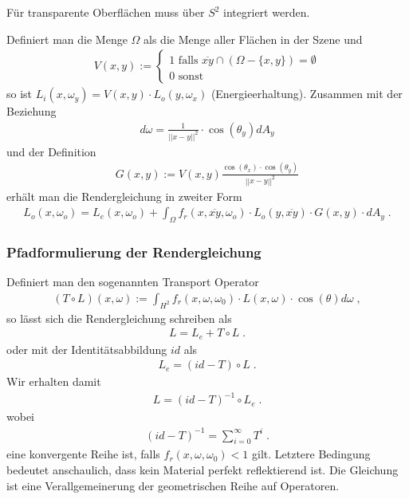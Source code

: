 \begin{Bemerkung}
Für transparente Oberflächen muss über $S^2$ integriert werden.
\end{Bemerkung}
Definiert man die Menge $\Omega$  als die Menge aller Flächen  in der Szene und
\begin{align}
V(x,y) := \begin{cases}
1 \text{ falls } \overline{xy} \cap (\Omega -\{x,y\}) = \emptyset \\
0 \text{ sonst }
\end{cases}
\end{align}
so ist $L_i(x, \omega_y) = V(x,y) \cdot L_o(y, \omega_x)$ (Energieerhaltung).
Zusammen mit der Beziehung 
\begin{align}
d\omega =  \frac{1}{||x -y||^2} \cdot  \cos(\theta_y) dA_y
\end{align}
 und der Definition 
\begin{align}
G(x,y) := V(x,y)  \frac{ \cos(\theta_x) \cdot  \cos(\theta_y)}{||x -y||^2} 
\end{align}
erhält man die Rendergleichung in zweiter Form 
\begin{align}
L_o(x, \omega_o) = L_e(x, \omega_o)  + \displaystyle \int_{\Omega} f_r (x, \overline{xy}, \omega_o) \cdot   L_o(y, \overline{xy})  \cdot  G(x,y) \cdot   dA_y \; .
\end{align} 

\subsubsection{Pfadformulierung der Rendergleichung}
Definiert man den sogenannten Transport  Operator
\begin{align}
(T \circ  L)(x, \omega) :=  \displaystyle \int_{H^2}f_r (x, \omega, \omega_0) \cdot L(x, \omega)  \cdot  \cos(\theta) d\omega \; ,
\end{align}
so lässt sich die Rendergleichung schreiben als
\begin{align}
L = L_e + T \circ L \; .
\end{align}
oder mit der Identitätsabbildung $id$ als
\begin{align}
L_e = (id - T) \circ L \; .
\end{align}
Wir erhalten damit 
\begin{align}
L = (id - T)^{-1} \circ L_e \; .
\end{align}
wobei 
\begin{align}
 (id - T)^{-1}= \sum_{i= 0}^{\infty} T^i  \; .
\end{align}
eine konvergente Reihe ist, falls $f_r (x, \omega, \omega_0) < 1$ gilt. Letztere Bedingung bedeutet anschaulich,  dass kein Material perfekt reflektierend ist. Die Gleichung ist eine Verallgemeinerung der geometrischen Reihe auf Operatoren.
 
